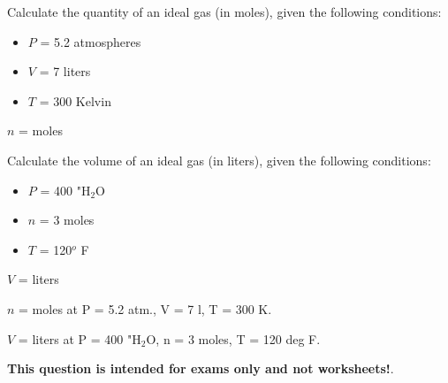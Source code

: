 

Calculate the quantity of an ideal gas (in moles), given the following conditions:

\begin{itemize}
\item{} $P$ = 5.2 atmospheres
\item{} $V$ = 7 liters
\item{} $T$ = 300 Kelvin
\end{itemize}

$n$ = \underbar{\hskip 50pt} moles

\vskip 100pt

Calculate the volume of an ideal gas (in liters), given the following conditions:

\begin{itemize}
\item{} $P$ = 400 "H$_{2}$O
\item{} $n$ = 3 moles
\item{} $T$ = 120$^{o}$ F
\end{itemize}

$V$ = \underbar{\hskip 50pt} liters








$n$ =  moles at P = 5.2 atm., V = 7 l, T = 300 K.

\vskip 10pt

$V$ =  liters at P = 400 "H$_{2}$O, n = 3 moles, T = 120 deg F.







{\bf This question is intended for exams only and not worksheets!}.



